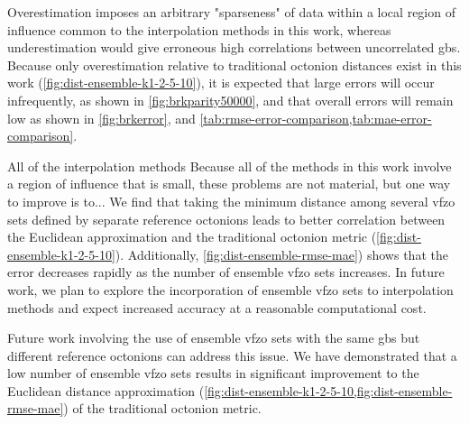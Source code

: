 \documentclass[final,twocolumn,12pt]{elsarticle}
\begin{document}
Overestimation imposes an arbitrary "sparseness" of data within a local region of influence common to the interpolation methods in this work, whereas underestimation would give erroneous high correlations between uncorrelated \glspl{gb}. Because only overestimation relative to traditional octonion distances exist in this work (\cref{fig:dist-ensemble-k1-2-5-10}), it is expected that large errors will occur infrequently, as shown in \cref{fig:brkparity50000}, and that overall errors will remain low as shown in \cref{fig:brkerror}, and \cref{tab:rmse-error-comparison,tab:mae-error-comparison}. 

All of the interpolation methods Because all of the methods in this work involve a region of influence that is small, these problems are not material, but one way to improve is to... We find that taking the minimum distance among several \gls{vfzo} sets defined by separate reference octonions leads to better correlation between the Euclidean approximation and the traditional octonion metric (\cref{fig:dist-ensemble-k1-2-5-10}). Additionally, \cref{fig:dist-ensemble-rmse-mae}) shows that the error decreases rapidly as the number of ensemble \gls{vfzo} sets increases. In future work, we plan to explore the incorporation of ensemble \gls{vfzo} sets to interpolation methods and expect increased accuracy at a reasonable computational cost.

Future work involving the use of ensemble \gls{vfzo} sets with the same \glspl{gb} but different reference octonions can address this issue. We have demonstrated that a low number of ensemble \gls{vfzo} sets results in significant improvement to the Euclidean distance approximation (\cref{fig:dist-ensemble-k1-2-5-10,fig:dist-ensemble-rmse-mae}) of the traditional octonion metric.
\end{document}

